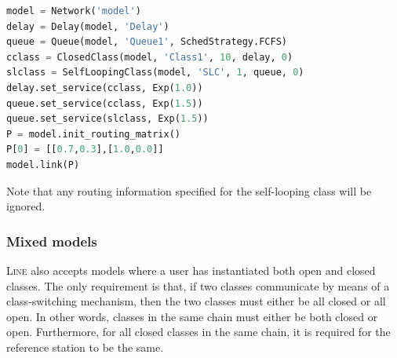 \begin{PYTHON}
\begin{lstlisting}[language = python]
model = Network('model')
delay = Delay(model, 'Delay')
queue = Queue(model, 'Queue1', SchedStrategy.FCFS)
cclass = ClosedClass(model, 'Class1', 10, delay, 0)
slclass = SelfLoopingClass(model, 'SLC', 1, queue, 0)
delay.set_service(cclass, Exp(1.0))
queue.set_service(cclass, Exp(1.5))
queue.set_service(slclass, Exp(1.5))
P = model.init_routing_matrix()
P[0] = [[0.7,0.3],[1.0,0.0]]
model.link(P)
\end{lstlisting}
\end{PYTHON}
Note that any routing information specified for the self-looping class will be ignored.

\subsubsection{Mixed models}
\textsc{Line} also accepts models where a user has instantiated both open and closed classes. The only requirement is that, if two classes communicate by means of a class-switching mechanism, then the two classes must either be all closed or all open. In other words, classes in the same chain must either be both closed or open. Furthermore, for all closed classes in the same chain, it is required for the reference station to be the same.

